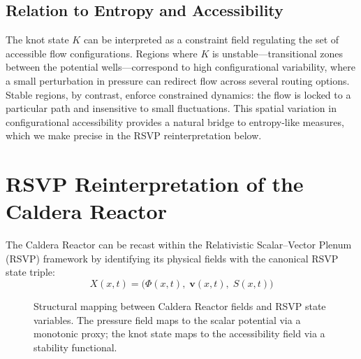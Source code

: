 \documentclass[12pt, a4paper]{article}
\begin{document}
\subsection{Relation to Entropy and Accessibility}

The knot state $K$ can be interpreted as a constraint field regulating the set of accessible flow configurations. Regions where $K$ is unstable—transitional zones between the potential wells—correspond to high configurational variability, where a small perturbation in pressure can redirect flow across several routing options. Stable regions, by contrast, enforce constrained dynamics: the flow is locked to a particular path and insensitive to small fluctuations. This spatial variation in configurational accessibility provides a natural bridge to entropy-like measures, which we make precise in the RSVP reinterpretation below.

\section{RSVP Reinterpretation of the Caldera Reactor}

The Caldera Reactor can be recast within the Relativistic Scalar--Vector Plenum (RSVP) framework by identifying its physical fields with the canonical RSVP state triple:
\[
X(x,t) = \bigl(\Phi(x,t),\;\mathbf{v}(x,t),\;S(x,t)\bigr)
\]

\begin{figure}[h]
\centering
{}
\caption{Structural mapping between Caldera Reactor fields and RSVP state variables. The pressure field maps to the scalar potential via a monotonic proxy; the knot state maps to the accessibility field via a stability functional.}
\end{figure}
\end{document}
